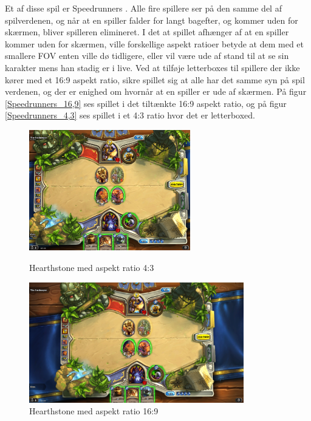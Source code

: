 \documentclass[Main.tex]{AspectRatio.tex}
\begin{document}
Et af disse spil er Speedrunners \cite{SpeedrunnersGame}. Alle fire spillere ser på den samme del af spilverdenen, og når at en spiller falder for langt bagefter, og kommer uden for skærmen, bliver spilleren elimineret. I det at spillet afhænger af at en spiller kommer uden for skærmen, ville forskellige aspekt ratioer betyde at dem med et smallere FOV enten ville dø tidligere, eller vil være ude af stand til at se sin karakter mens han stadig er i live. Ved at tilføje letterboxes til spillere der ikke kører med et 16:9 aspekt ratio, sikre spillet sig at alle har det samme syn på spil verdenen, og der er enighed om hvornår at en spiller er ude af skærmen. På figur \ref{Speedrunners_16,9} ses spillet i det tiltænkte 16:9 aspekt ratio, og på figur \ref{Speedrunners_4,3} ses spillet i et 4:3 ratio hvor det er letterboxed.

\begin{figure}[h]
\centering
\parbox{7cm}{
\includegraphics[width = 7cm]{billeder/Heathstone_4,3}
\caption{Hearthstone med aspekt ratio 4:3}
\label{Hearthstone_4,3}}
\qquad
\begin{minipage}{9.33cm}
\includegraphics[width = 9.33cm]{billeder/Heathstone_16,9}
\caption{Hearthstone med aspekt ratio 16:9}
\label{Hearthstone_16,9}
\end{minipage}
\end{figure}
\end{document}
